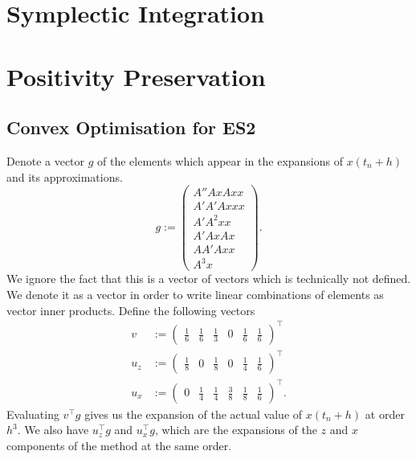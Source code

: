 \appendix

\section{Symplectic Integration}

\section{Positivity Preservation}

\subsection{Convex Optimisation for ES2}

Denote a vector $g$ of the elements which appear in the expansions of $x(t_n+h)$ and its approximations.
\begin{equation*}
    g := \begin{pmatrix}
        A'' Ax Ax x \\
        A' A' A xxx \\
        A' A^2 xx \\
        A' Ax Ax \\
        A A' A xx \\
        A^3 x
    \end{pmatrix}.
\end{equation*}
We ignore the fact that this is a vector of vectors which is technically not defined.
We denote it as a vector in order to write linear combinations of elements as vector inner products. %
Define the following vectors
\begin{align*}
    v &:= \begin{pmatrix}
        \frac{1}{6} & \frac{1}{6} & \frac{1}{3} & 0 & \frac{1}{6} & \frac{1}{6}
    \end{pmatrix}^\top \\
    u_z &:= \begin{pmatrix}
        \frac{1}{8} & 0 & \frac{1}{8} & 0 & \frac{1}{4} & \frac{1}{6}
    \end{pmatrix}^\top \\
    u_x &:= \begin{pmatrix}
        0 & \frac{1}{4} & \frac{1}{4} & \frac{3}{8} & \frac{1}{8} & \frac{1}{6}
    \end{pmatrix}^\top .
\end{align*}
Evaluating $v^\top g$ gives us the expansion of the actual value of $x(t_n+h)$ at order $h^3$.
We also have $u_z^\top g$ and $u_x^\top g$, which are the expansions of the $z$ and $x$ components of the method at the same order.
